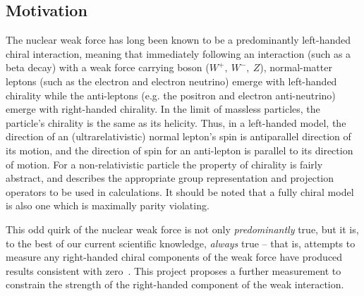 \subsection{Motivation}
\label{rslow_motivation}

The nuclear weak force has long been known to be a predominantly left-handed chiral interaction, meaning that immediately following an interaction (such as a beta decay) with a weak force carrying boson ($W^+,\: W^-,\: Z$), 
normal-matter leptons (such as the electron and electron neutrino) emerge with left-handed chirality
while the anti-leptons (e.g. the positron and electron anti-neutrino) emerge with right-handed chirality.  
In the limit of massless particles, the particle's chirality is the same as its helicity. Thus, in a left-handed model, the direction of an (ultrarelativistic) normal lepton's spin is antiparallel direction of its motion, and the direction of spin for an anti-lepton is parallel to its direction of motion.  For a non-relativistic particle the property of chirality is fairly abstract, and describes the appropriate group representation and projection operators to be used in calculations.  It should be noted that a fully chiral model is also one which is maximally parity violating.

This odd quirk of the nuclear weak force is not only \emph{predominantly} true, but it is, to the best of our current scientific knowledge, \emph{always} true -- that is, attempts to measure any right-handed chiral components of the weak force have produced results consistent with zero~\cite{severijns_beck_cuncic_2006}\cite{severijns_cuncic_2011}.  This project proposes a further measurement to constrain the strength of the right-handed component of the weak interaction.  

%

